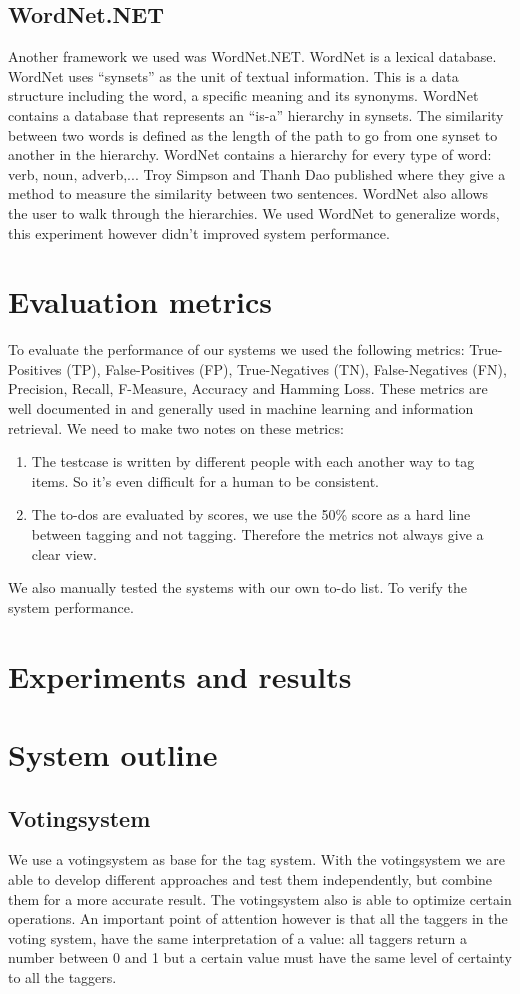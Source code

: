 \documentclass[a4paper,titlepage]{article}
\begin{document}
\subsection{WordNet.NET}
Another framework we used was WordNet.NET. WordNet is a lexical database. WordNet uses ``synsets'' as the unit of textual information. This is a data structure including the word, a specific meaning and its synonyms. WordNet contains a database that represents an ``is-a'' hierarchy in synsets. The similarity between two words is defined as the length of the path to go from one synset to another in the hierarchy. WordNet contains a hierarchy for every type of word: verb, noun, adverb,... Troy Simpson and Thanh Dao published \cite{codeproject1} where they give a method to measure the similarity between two sentences. WordNet also allows the user to walk through the hierarchies. We used WordNet to generalize words, this experiment however didn't improved system performance.
\section{Evaluation metrics}
To evaluate the performance of our systems we used the following metrics: True-Positives (TP), False-Positives (FP), True-Negatives (TN), False-Negatives (FN), Precision, Recall, F-Measure, Accuracy and Hamming Loss. These metrics are well documented in \cite{Francis99performancemeasures} and generally used in machine learning and information retrieval. We need to make two notes on these metrics:
\begin{enumerate}
 \item The testcase is written by different people with each another way to tag items. So it's even difficult for a human to be consistent.
 \item The to-dos are evaluated by scores, we use the 50\% score as a hard line between tagging and not tagging. Therefore the metrics not always give a clear view.
\end{enumerate}
We also manually tested the systems with our own to-do list. To verify the system performance.
\section{Experiments and results}
\section{System outline}
\subsection{Votingsystem}
We use a votingsystem as base for the tag system. With the votingsystem we are able to develop different approaches and test them independently, but combine them for a more accurate result. The votingsystem also is able to optimize certain operations. An important point of attention however is that all the taggers in the voting system, have the same interpretation of a value: all taggers return a number between 0 and 1
but a certain value must have the same level of certainty to all the taggers.
\end{document}
